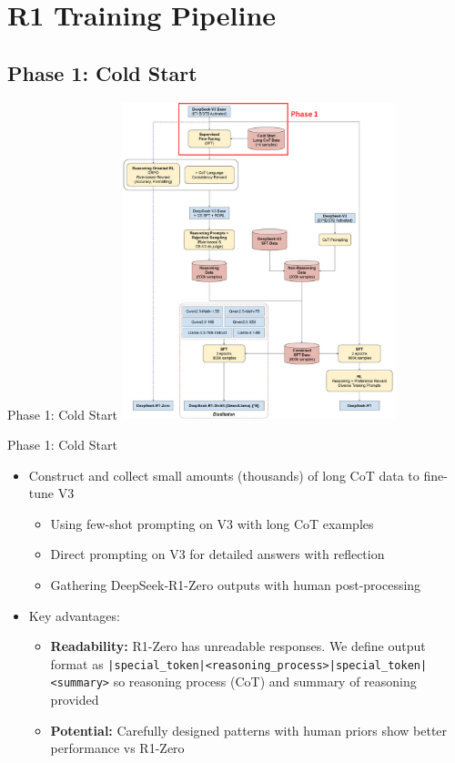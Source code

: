 \documentclass[8pt]{beamer}
\begin{document}
\section{R1 Training Pipeline}

\subsection{Phase 1: Cold Start}

\begin{frame}{Phase 1: Cold Start}
\centering
\includegraphics[width=0.6\textwidth]{figures/phase1.png}
\end{frame}

\begin{frame}{Phase 1: Cold Start}

\begin{itemize} \setlength{\itemsep}{10pt}
\item Construct and collect small amounts (thousands) of long CoT data to fine-tune V3
    \begin{itemize} \setlength{\itemsep}{5pt}
    \item Using few-shot prompting on V3 with long CoT examples
    \item Direct prompting on V3 for detailed answers with reflection
    \item Gathering DeepSeek-R1-Zero outputs with human post-processing
    \end{itemize}

\item Key advantages:
    \begin{itemize} \setlength{\itemsep}{5pt}
    \item \textbf{Readability:} R1-Zero has unreadable responses. We define output format as \texttt{|special\_token|<reasoning\_process>|special\_token|<summary>} so reasoning process (CoT) and summary of reasoning provided
    \item \textbf{Potential:} Carefully designed patterns with human priors show better performance vs R1-Zero
    \end{itemize}
\end{itemize}
    
\end{frame}
\end{document}
